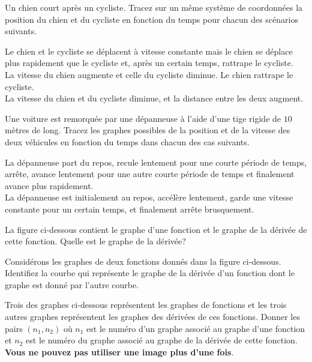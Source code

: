 \begin{question}
Un chien court après un cycliste.  Tracez sur un même système de
coordonnées la position du chien et du cycliste en fonction du temps
pour chacun des scénarios suivants.

 Le chien et le cycliste se déplacent à vitesse constante mais
le chien se déplace plus rapidement que le cycliste et, après un
certain temps, rattrape le cycliste.\\
 La vitesse du chien augmente et celle du cycliste diminue.
Le chien rattrape le cycliste.\\
 La vitesse du chien et du cycliste diminue, et la distance
entre les deux augment.
\label{5Q8}
\end{question}

\begin{question}
Une voiture est remorquée par une dépanneuse à l'aide d'une tige
rigide de $10$ mètres de long.  Tracez les graphes possibles de la
position et de la vitesse des deux véhicules en fonction du temps dans
chacun des cas suivants.

 La dépanneuse part du repos, recule lentement pour une courte
période de temps, arrête, avance lentement pour une autre courte
période de temps et finalement avance plus rapidement.\\
 La dépanneuse est initialement au repos, accélère lentement,
garde une vitesse constante pour un certain temps, et finalement
arrête brusquement.
\label{5Q9}
\end{question}

\begin{question}
La figure ci-dessous contient le graphe d'une fonction et le graphe de la
dérivée de cette fonction.  Quelle est le graphe de la dérivée?
\label{5Q10}
\end{question}

\begin{question}
Considérons les graphes de deux fonctions donnés dans la figure ci-dessous.
Identifiez la courbe qui représente le graphe de la dérivée d'un
fonction dont le graphe est donné par l'autre courbe.
\label{5Q11}
\end{question}

\begin{question}
Trois des graphes ci-dessous représentent les graphes de fonctions et
les trois autres graphes représentent les graphes des dérivées de ces
fonctions.  Donner les pairs $(n_1, n_2)$ où $n_1$ est le numéro d'un
graphe associé au graphe d'une fonction et $n_2$ est le numéro du
graphe associé au graphe de la dérivée de cette fonction.
{\bfseries Vous ne pouvez pas utiliser une image plus d'une fois}.
\label{5Q12}
\end{question}

